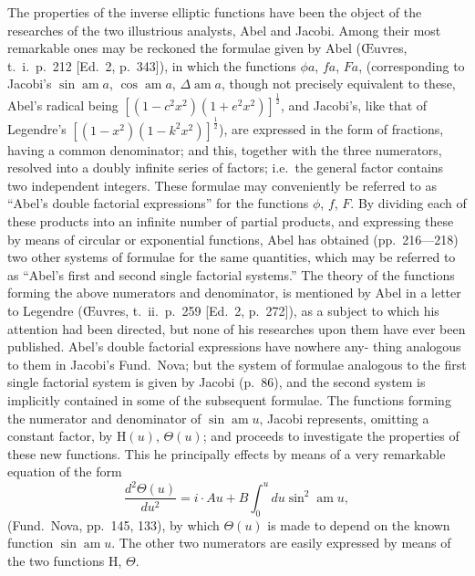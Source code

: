 \documentclass[11pt,a4paper]{book}
\begin{document}
The properties of the inverse elliptic functions have been the object of the
researches of the two illustrious analysts, Abel and Jacobi. Among their most remarkable
ones may be reckoned the formulae given by Abel (\OE uvres, t.~i.\ p.~212 [Ed.~2, p.~343]), in
which the functions $\phi a$, $fa$, $Fa$, (corresponding to Jacobi's $\sin \operatorname{am} a$, $\cos \operatorname{am} a$, $\Delta \operatorname{am} a$,
though not precisely equivalent to these, Abel's radical being $[(1 - c^2x^2)(1 + e^2x^2)]^{\frac{1}{2}}$, and
Jacobi's, like that of Legendre's $[(1 - x^2)(1 - k^2x^2)]^{\frac{1}{2}}$), are expressed in the form of fractions,
having a common denominator; and this, together with the three numerators, resolved
into a doubly infinite series of factors; i.e.\ the general factor contains two independent
integers. These formulae may conveniently be referred to as ``Abel's double factorial
expressions'' for the functions $\phi$, $f$, $F$. By dividing each of these products into an
infinite number of partial products, and expressing these by means of circular or
exponential functions, Abel has obtained (pp.~216---218) two other systems of formulae for
the same quantities, which may be referred to as ``Abel's first and second single factorial
systems.'' The theory of the functions forming the above numerators and denominator,
is mentioned by Abel in a letter to Legendre (\OE uvres, t.~ii.\ p.~259 [Ed.~2, p.~272]), as
a subject to which his attention had been directed, but none of his researches upon
them have ever been published. Abel's double factorial expressions have nowhere any-
thing analogous to them in Jacobi's Fund.\ Nova; but the system of formulae analogous
to the first single factorial system is given by Jacobi (p.~86), and the second system
is implicitly contained in some of the subsequent formulae. The functions forming the
numerator and denominator of $\sin \operatorname{am} u$, Jacobi represents, omitting a constant factor,
by $\mathrm{H}(u)$, $\Theta(u)$; and proceeds to investigate the properties of these new functions. This
he principally effects by means of a very remarkable equation of the form
\[
\frac{d^2\Theta(u)}{du^2} = i \cdot Au + B \int_0^u du \sin^2 \operatorname{am} u,
\]
(Fund.\ Nova, pp.~145, 133), by which $\Theta(u)$ is made to depend on the known function
$\sin \operatorname{am} u$. The other two numerators are easily expressed by means of the two
functions $\mathrm{H}$, $\Theta$.
\end{document}
